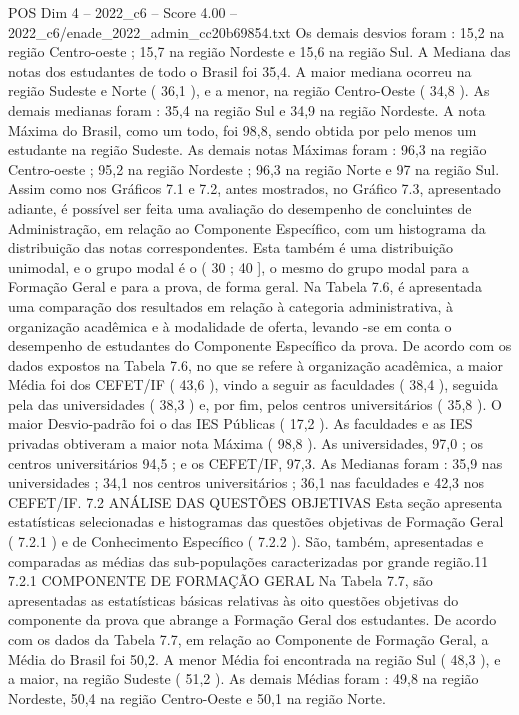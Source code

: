 \begin{textsample}{POS Dim 4 – 2022\_c6 – Score 4.00 – 2022\_c6/enade\_2022\_admin\_cc20b69854.txt}
Os demais desvios foram : 15,2 na região Centro-oeste ; 15,7 na região Nordeste e 15,6 na região Sul.
A Mediana das notas dos estudantes de todo o Brasil foi 35,4.
A maior mediana ocorreu na região Sudeste e Norte ( 36,1 ), e a menor, na região Centro-Oeste ( 34,8 ).
As demais medianas foram : 35,4 na região Sul e 34,9 na região Nordeste.
A nota Máxima do Brasil, como um todo, foi 98,8, sendo obtida por pelo menos um estudante na região Sudeste.
As demais notas Máximas foram : 96,3 na região Centro-oeste ; 95,2 na região Nordeste ; 96,3 na região Norte e 97 na região Sul.
Assim como nos Gráficos 7.1 e 7.2, antes mostrados, no Gráfico 7.3, apresentado adiante, é possível ser feita uma avaliação do desempenho de concluintes de Administração, em relação ao Componente Específico, com um histograma da distribuição das notas correspondentes.
Esta também é uma distribuição unimodal, e o grupo modal é o ( 30 ; 40 ], o mesmo do grupo modal para a Formação Geral e para a prova, de forma geral.
Na Tabela 7.6, é apresentada uma comparação dos resultados em relação à categoria administrativa, à organização acadêmica e à modalidade de oferta, levando -se em conta o desempenho de estudantes do Componente Específico da prova.
De acordo com os dados expostos na Tabela 7.6, no que se refere à organização acadêmica, a maior Média foi dos CEFET/IF ( 43,6 ), vindo a seguir as faculdades ( 38,4 ), seguida pela das universidades ( 38,3 ) e, por fim, pelos centros universitários ( 35,8 ).
O maior Desvio-padrão foi o das IES Públicas ( 17,2 ).
As faculdades e as IES privadas obtiveram a maior nota Máxima ( 98,8 ).
As universidades, 97,0 ; os centros universitários 94,5 ; e os CEFET/IF, 97,3.
As Medianas foram : 35,9 nas universidades ; 34,1 nos centros universitários ; 36,1 nas faculdades e 42,3 nos CEFET/IF. 7.2 ANÁLISE DAS QUESTÕES OBJETIVAS Esta seção apresenta estatísticas selecionadas e histogramas das questões objetivas de Formação Geral ( 7.2.1 ) e de Conhecimento Específico ( 7.2.2 ).
São, também, apresentadas e comparadas as médias das sub-populações caracterizadas por grande região.11 7.2.1 COMPONENTE DE FORMAÇÃO GERAL Na Tabela 7.7, são apresentadas as estatísticas básicas relativas às oito questões objetivas do componente da prova que abrange a Formação Geral dos estudantes.
De acordo com os dados da Tabela 7.7, em relação ao Componente de Formação Geral, a Média do Brasil foi 50,2.
A menor Média foi encontrada na região Sul ( 48,3 ), e a maior, na região Sudeste ( 51,2 ).
As demais Médias foram : 49,8 na região Nordeste, 50,4 na região Centro-Oeste e 50,1 na região Norte.

\end{textsample}
